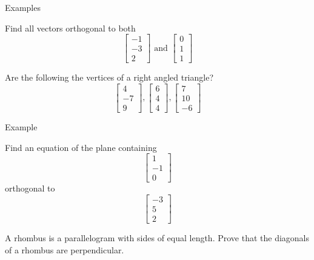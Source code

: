 \documentclass{beamer}
\begin{document}
\begin{frame}{Examples}
  \begin{example}
    Find all vectors orthogonal to both
    \begin{equation*}
      \left[
	\begin{array}{c}
          -1\\
          -3\\
          2
	\end{array}
      \right]\text{ and }
      \left[
	\begin{array}{c}
          0\\
          1\\
          1
	\end{array}
      \right]
    \end{equation*}
  \end{example}
  \begin{example}
    Are the following the vertices of a right angled triangle?
    \begin{equation*}
      \left[
	\begin{array}{c}
          4\\
          -7\\
          9
	\end{array}
      \right], \left[
	\begin{array}{c}
          6\\
          4\\
          4
	\end{array}
      \right], \left[
	\begin{array}{c}
          7\\
          10\\
          -6
	\end{array}
      \right]
    \end{equation*}
  \end{example}
\end{frame}

\begin{frame}{Example}
  \begin{example}
    Find an equation of the plane containing
    \begin{equation*}
      \left[
	\begin{array}{c}
          1\\
          -1\\
          0
	\end{array}
      \right]
    \end{equation*}
    orthogonal to
    \begin{equation*}
      \left[
	\begin{array}{c}
          -3\\
          5\\
          2
	\end{array}
      \right]
    \end{equation*}
  \end{example}
  \begin{example}
    A rhombus is a parallelogram with sides of equal length.
    Prove that the diagonals of a rhombus are perpendicular.
  \end{example}
\end{frame}
\end{document}
